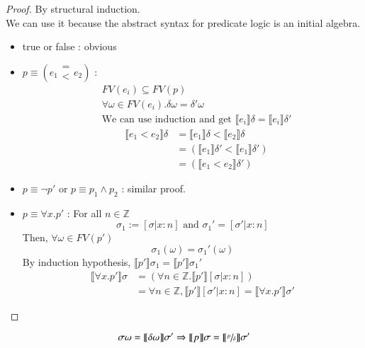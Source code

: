 \documentclass{article}[12pt]
\begin{document}
\begin{proof}
    By structural induction. \\
    We can use it because the abstract syntax for predicate logic is an initial algebra.
    \begin{itemize}
        \item true or false :  obvious
        \item $p\equiv (e_1 \begin{array}{c} =\\<\end{array}e_2)$ :
        \begin{align*}
            &FV(e_i) \subseteq FV(p) \\
            &\forall \omega \in FV(e_i). \delta \omega = \delta' \omega \\
            &\text{We can use induction and get }\llbracket e_i \rrbracket \delta = \llbracket e_i \rrbracket \delta'
        \end{align*}
        \begin{align*}
            &\llbracket e_1 < e_2 \rrbracket \delta &= \llbracket e_1 \rrbracket \delta < \llbracket e_2 \rrbracket \delta \\
            & &= (\llbracket e_1 \rrbracket \delta' < \llbracket e_1 \rrbracket \delta') \\
            & &= (\llbracket e_1 < e_2 \rrbracket \delta')
        \end{align*}
        \item $p\equiv \neg p'$ or $p\equiv p_1 \wedge p_2$ : similar proof.
        \item $p\equiv \forall x.p'$ : For all $n \in \mathbb{Z}$
        \[\sigma_1 := [\sigma|x:n]\text{ and }\sigma_1'=[\sigma'|x:n]\]
        Then, $\forall \omega \in FV(p')$
        \[\sigma_1(\omega)=\sigma_1'(\omega)\]
        By induction hypothesis, $\llbracket p' \rrbracket \sigma_1 = \llbracket p' \rrbracket \sigma_1'$ \\
        \begin{align*}
            \llbracket \forall x. p' \rrbracket \sigma &= (\forall n \in \mathbb{Z}. \llbracket p' \rrbracket [\sigma|x:n]) \\
            &=\forall n \in \mathbb{Z}, \llbracket p' \rrbracket [\sigma' | x:n] = \llbracket \forall x. p' \rrbracket \sigma'
        \end{align*}
    \end{itemize}
\end{proof}
\begin{proposition}[Substitution]
    \[\sigma \omega = \llbracket \delta \omega \rrbracket \sigma' \Rightarrow \llbracket p\rrbracket \sigma = \llbracket \sfrac{p}{\delta} \rrbracket \sigma'\]
\end{proposition}
\end{document}
